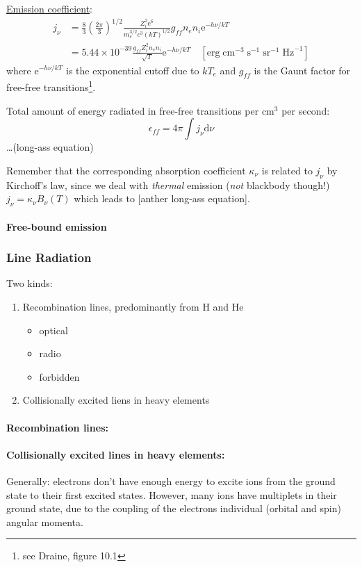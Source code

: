 \documentclass[12pt]{article}
\newcommand{\mar}[1]{\hspace{0pt}\marginpar{-\textcolor{black}{#1}-}}
\begin{document}
\underline{Emission coefficient}:
\begin{align*}
    j_{\nu} &= \frac{8}{3}\left(\frac{2\pi}{3}\right)^{1/2}
    \frac{Z_{i}^{2}\mathrm{e}^{6}}{m_{e}^{3/2}c^{3}(kT)^{1/2}}
    g_{ff}n_{e}n_{i}\mathrm{e}^{-h\nu/kT}\\
    &= 5.44\times10^{-39}\frac{g_{ff}Z_{i}^{2}n_{e}n_{i}}{\sqrt{T}}
    \mathrm{e}^{-h\nu/kT}\quad
    [\mathrm{erg}\;\mathrm{cm}^{-3}\;\mathrm{s}^{-1}\;\mathrm{sr}^{-1}\;\mathrm{Hz}^{-1}]
\end{align*}
where $\mathrm{e}^{-h\nu/kT}$ is the exponential cutoff due to $kT_{e}$
and $g_{ff}$ is the Gaunt factor for free-free transitions\footnote{see
Draine, figure 10.1}.

Total amount of energy radiated in free-free transitions per cm$^{3}$
per second:$${
    \epsilon_{ff} = 4\pi\int{j_{\nu}\mathrm{d}\nu}
}$$\ldots (long-ass equation)

Remember that the corresponding absorption coefficient $\kappa_{\nu}$
is related to $j_{\nu}$ by Kirchoff's law, since we deal with
\emph{thermal} emission (\emph{not} blackbody though!)
$j_{\nu} = \kappa_{\nu}B_{\nu}(T)$ which leads to [anther long-ass
equation].

\paragraph{Free-bound emission}\mar{68}

\subsubsection{Line Radiation}\mar{69}
Two kinds:
\begin{enumerate}
    \item Recombination lines, predominantly from H and He
        \begin{itemize}
            \item optical
            \item radio
            \item forbidden
        \end{itemize}
    \item Collisionally excited liens in heavy elements
\end{enumerate}
\paragraph{Recombination lines:}
\paragraph{Collisionally excited lines in heavy elements:}\mar{79}
Generally: electrons don't have enough energy to excite ions from
the ground state to their first excited states. However, many
ions have multiplets in their ground state, due to the coupling of
the electrons individual (orbital and spin) angular momenta.
\end{document}
